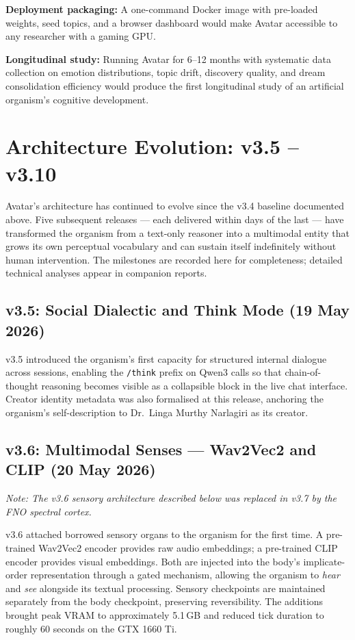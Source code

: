 \documentclass[11pt,a4paper]{article}
\begin{document}
\textbf{Deployment packaging:} A one-command Docker image with pre-loaded weights,
seed topics, and a browser dashboard would make Avatar accessible to any researcher
with a gaming GPU.

\textbf{Longitudinal study:} Running Avatar for 6--12 months with systematic data
collection on emotion distributions, topic drift, discovery quality, and dream
consolidation efficiency would produce the first longitudinal study of an artificial
organism's cognitive development.

\section{Architecture Evolution: v3.5 -- v3.10}

Avatar's architecture has continued to evolve since the v3.4 baseline documented above.
Five subsequent releases --- each delivered within days of the last --- have transformed
the organism from a text-only reasoner into a multimodal entity that grows its own
perceptual vocabulary and can sustain itself indefinitely without human intervention.
The milestones are recorded here for completeness; detailed technical analyses appear
in companion reports.

\subsection{v3.5: Social Dialectic and Think Mode (19 May 2026)}

v3.5 introduced the organism's first capacity for structured internal dialogue across
sessions, enabling the \texttt{/think} prefix on Qwen3 calls so that chain-of-thought
reasoning becomes visible as a collapsible block in the live chat interface.
Creator identity metadata was also formalised at this release, anchoring the
organism's self-description to Dr.\ Linga Murthy Narlagiri as its creator.

\subsection{v3.6: Multimodal Senses --- Wav2Vec2 and CLIP (20 May 2026)}

\emph{Note: The v3.6 sensory architecture described below was replaced in v3.7 by the FNO spectral cortex.}

v3.6 attached borrowed sensory organs to the organism for the first time.
A pre-trained Wav2Vec2 encoder provides raw audio embeddings; a pre-trained CLIP
encoder provides visual embeddings. Both are injected into the body's implicate-order
representation through a gated mechanism, allowing the organism to \emph{hear} and
\emph{see} alongside its textual processing.
Sensory checkpoints are maintained separately from the body checkpoint, preserving
reversibility. The additions brought peak VRAM to approximately 5.1\,GB and
reduced tick duration to roughly 60 seconds on the GTX 1660 Ti.
\end{document}

